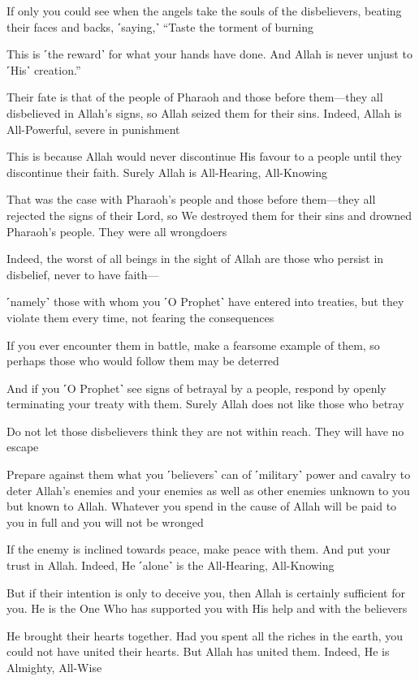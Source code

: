 If only you could see when the angels take the souls of the disbelievers, beating their faces and backs, ˹saying,˺ “Taste the torment of burning

This is ˹the reward˺ for what your hands have done. And Allah is never unjust to ˹His˺ creation.”

Their fate is that of the people of Pharaoh and those before them—they all disbelieved in Allah’s signs, so Allah seized them for their sins. Indeed, Allah is All-Powerful, severe in punishment

This is because Allah would never discontinue His favour to a people until they discontinue their faith. Surely Allah is All-Hearing, All-Knowing

That was the case with Pharaoh’s people and those before them—they all rejected the signs of their Lord, so We destroyed them for their sins and drowned Pharaoh’s people. They were all wrongdoers

Indeed, the worst of all beings in the sight of Allah are those who persist in disbelief, never to have faith—

˹namely˺ those with whom you ˹O Prophet˺ have entered into treaties, but they violate them every time, not fearing the consequences

If you ever encounter them in battle, make a fearsome example of them, so perhaps those who would follow them may be deterred

And if you ˹O Prophet˺ see signs of betrayal by a people, respond by openly terminating your treaty with them. Surely Allah does not like those who betray

Do not let those disbelievers think they are not within reach. They will have no escape

Prepare against them what you ˹believers˺ can of ˹military˺ power and cavalry to deter Allah’s enemies and your enemies as well as other enemies unknown to you but known to Allah. Whatever you spend in the cause of Allah will be paid to you in full and you will not be wronged

If the enemy is inclined towards peace, make peace with them. And put your trust in Allah. Indeed, He ˹alone˺ is the All-Hearing, All-Knowing

But if their intention is only to deceive you, then Allah is certainly sufficient for you. He is the One Who has supported you with His help and with the believers

He brought their hearts together. Had you spent all the riches in the earth, you could not have united their hearts. But Allah has united them. Indeed, He is Almighty, All-Wise

